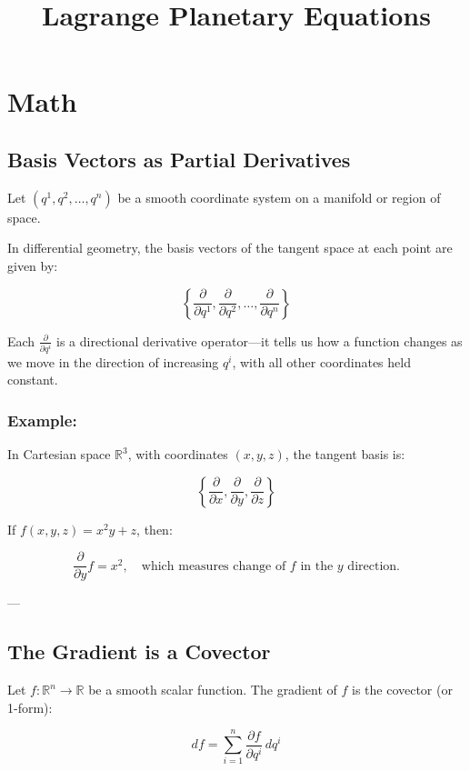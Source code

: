 \documentclass{article}
\title{Lagrange Planetary Equations}
\author{}
\date{}
\begin{document}
\maketitle

\section{Math}
\subsection{Basis Vectors as Partial Derivatives}

Let \( (q^1, q^2, \dots, q^n) \) be a smooth coordinate system on a manifold or region of space.

In differential geometry, the basis vectors of the tangent space at each point are given by:

\[
\left\{ \frac{\partial}{\partial q^1}, \frac{\partial}{\partial q^2}, \dots, \frac{\partial}{\partial q^n} \right\}
\]

Each \( \frac{\partial}{\partial q^i} \) is a directional derivative operator—it tells us how a function changes as we move in the direction of increasing \( q^i \), with all other coordinates held constant.

\subsubsection*{Example:}

In Cartesian space \( \mathbb{R}^3 \), with coordinates \( (x, y, z) \), the tangent basis is:

\[
\left\{ \frac{\partial}{\partial x}, \frac{\partial}{\partial y}, \frac{\partial}{\partial z} \right\}
\]

If \( f(x, y, z) = x^2 y + z \), then:

\[
\frac{\partial}{\partial y} f = x^2, \quad \text{which measures change of } f \text{ in the } y \text{ direction}.
\]

---

\subsection{The Gradient is a Covector}

Let \( f: \mathbb{R}^n \to \mathbb{R} \) be a smooth scalar function. The gradient of \( f \) is the covector (or 1-form):

\[
df = \sum_{i=1}^n \frac{\partial f}{\partial q^i} \, dq^i
\]
\end{document}
